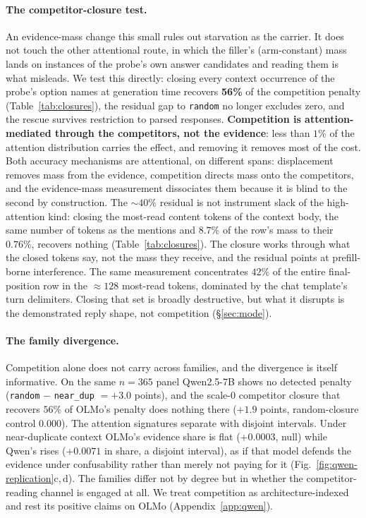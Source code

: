\documentclass{article}
\begin{document}
\paragraph{The competitor-closure test.}
An evidence-mass change this small rules out starvation as the carrier. It does not
touch the other attentional route,
in which the filler's (arm-constant) mass lands on instances of the probe's own answer
candidates and reading them is what misleads. We test this directly: closing every context
occurrence of the probe's option names at generation time recovers \textbf{56\%} of the
competition penalty (Table~\ref{tab:closures}), the residual gap to \texttt{random} no longer
excludes zero, and the rescue survives restriction to parsed responses. \textbf{Competition
is attention-mediated through the competitors, not the evidence}: less
than $1\%$ of the attention distribution carries the effect, and removing it removes most of
the cost. Both accuracy mechanisms are attentional, on different spans: displacement
removes mass from the evidence, competition directs mass onto the competitors, and the
evidence-mass measurement dissociates them because it is blind to the second by construction.
The ${\sim}40\%$ residual is not instrument slack of the high-attention kind: closing the
most-read content tokens of the context body, the same number of tokens as the
mentions and $8.7\%$ of the row's mass to their $0.76\%$, recovers
nothing (Table~\ref{tab:closures}). The closure works
through what the closed tokens say, not the mass they receive, and the residual
points at prefill-borne interference. The same measurement concentrates $42\%$ of
the entire final-position row in the ${\approx}128$ most-read tokens, dominated by the
chat template's turn delimiters. Closing that set is broadly destructive, but what it
disrupts is the demonstrated reply shape, not competition (\S\ref{sec:mode}).

\paragraph{The family divergence.}
Competition alone does not carry across families, and the divergence is itself informative. On the same $n{=}365$ panel Qwen2.5-7B shows no detected penalty
(\texttt{random} $-$ \texttt{near\_dup} $= +3.0$ points), and the scale-$0$
competitor closure that recovers $56\%$ of OLMo's penalty does nothing there ($+1.9$ points,
random-closure control $0.000$). The attention signatures separate with
disjoint intervals. Under near-duplicate context OLMo's evidence share is flat ($+0.0003$,
null) while Qwen's rises ($+0.0071$ in share, a disjoint interval), as if that model defends the
evidence under confusability rather than merely not paying for it
(Fig.~\ref{fig:qwen-replication}c,\,d). The families differ not by degree but in whether the competitor-reading channel is engaged at
all. We treat competition as architecture-indexed and rest its positive claims on OLMo
(Appendix~\ref{app:qwen}).
\end{document}
